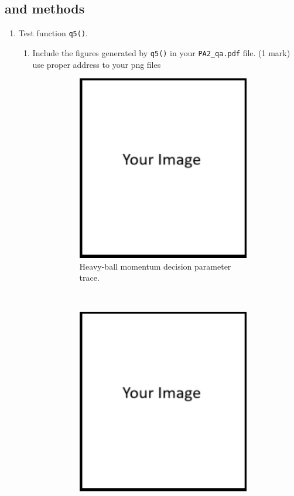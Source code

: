 \documentclass{article}
\theoremstyle{definition}
\begin{document}
\subsection{ and  methods}\label{mom}
\begin{enumerate}[label=\ref{mom}.\alph*]
	\item Test function \verb|q5()|.
	\begin{enumerate}[label=1.2.a.\roman*]
		\item Include the figures generated by \verb|q5()| in your \verb|PA2_qa.pdf| file. (1 mark)
		 use proper address to your png files
			\begin{figure}[h]
				\centering
				\begin{subfigure}[t]{0.5\textwidth}
					\centering
					\includegraphics[height=3.2in]{image.png}
					\caption{Heavy-ball momentum decision parameter trace.}
				\end{subfigure}%
				~ 
				\begin{subfigure}[t]{0.5\textwidth}
					\centering
					\includegraphics[height=3.2in]{image.png}

\end{subfigure}
\end{figure}
\end{enumerate}
\end{enumerate}
\end{document}
